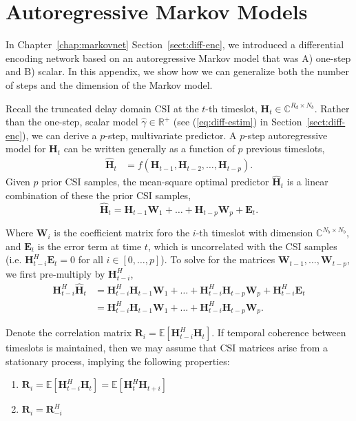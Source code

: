 \chapter{Autoregressive Markov Models}
\label{appdx:autoregressive}

In Chapter~\ref{chap:markovnet} Section~\ref{sect:diff-enc}, we introduced a differential encoding network based on an autoregressive Markov model that was A) one-step and B) scalar. In this appendix, we show how we can generalize both the number of steps and the dimension of the Markov model.

Recall the truncated delay domain CSI at the $t$-th timeslot, $\mathbf{H}_{t}\in\mathbb{C}^{R_d \times N_b}$. Rather than the one-step, scalar model $\hat\gamma \in \mathbb R^+$ (see (\ref{eq:diff-estim}) in Section~\ref{sect:diff-enc}), we can derive a $p$-step, multivariate predictor. A $p$-step autoregressive model for $\mathbf{H}_t$ can be written generally as a function of $p$ previous timeslots,
\begin{align*}
	\hat{\mathbf{H}}_t &= f(\mathbf{H}_{t-1}, \mathbf{H}_{t-2}, \dots, \mathbf{H}_{t-p}).
\end{align*}
Given $p$ prior CSI samples, the mean-square optimal predictor $\hat{\mathbf{H}}_t$ is a linear combination of these the prior CSI samples,
\begin{equation}
\mathbf{\hat H}_{t} = \mathbf{H}_{t-1} \mathbf W_{1} + \dots + \mathbf{H}_{t-p} \mathbf W_{p} + \mathbf E_t.
\end{equation}

Where $\mathbf{W}_{i}$ is the coefficient matrix foro the $i$-th timeslot with dimension $\mathbb{C}^{N_b \times N_b}$, and $\mathbf{E}_t$ is the error term at time $t$, which is uncorrelated with the CSI samples (i.e. $\mathbf H_{t-i}^H \mathbf E_t = 0$ for all $i \in [0, \dots, p]$). To solve for the matrices $\mathbf{W}_{t-1}, \dots, \mathbf{W}_{t-p}$, we first pre-multiply by $\mathbf H_{t-i}^H$,
\begin{align}
\mathbf{H}_{t-i}^H\mathbf{\hat H}_{t} &= \mathbf{H}_{t-i}^H\mathbf{H}_{t-1} \mathbf W_{1} + \dots + \mathbf{H}_{t-i}^H\mathbf{H}_{t-p} \mathbf W_{p} + \mathbf{H}_{t-i}^H\mathbf E_t \nonumber \\
                    &= \mathbf{H}_{t-i}^H\mathbf{H}_{t-1} \mathbf W_{1} + \dots + \mathbf{H}_{t-i}^H\mathbf{H}_{t-p} \mathbf W_{p}. \label{eq:var-init}
\end{align}

Denote the correlation matrix 
$\mathbf R_i = \mathbb E [\mathbf H^H_{t-i}\mathbf H_{t}]$. If temporal coherence between timeslots is maintained, then we may assume that CSI matrices arise from a stationary process, implying the following properties:
\begin{enumerate}
  \item $\mathbf R_i = \mathbb E [\mathbf H^H_{t-i}\mathbf H_{t}] = \mathbb E [\mathbf H^H_{t}\mathbf H_{t+i}]$
  \item $\mathbf R_i = \mathbf R^H_{-i}$
\end{enumerate}

